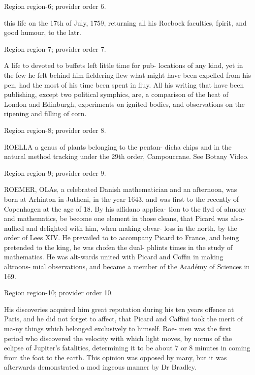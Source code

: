 \documentclass[11pt]{article}
\begin{document}
{\scriptsize\color{gray} Region region-6; provider order 6.\par}
\medskip

this life on the 17th of July, 1759, returning all his Roebock faculties, fpirit, and good humour, to the latr.
\par

{\scriptsize\color{gray} Region region-7; provider order 7.\par}
\medskip

A life to devoted to buffets left little time for pub- locations of any kind, yet in the few he felt behind him fieldering flew what might have been expelled from his pen, had the most of his time been spent in fluy. All his writing that have been publishing, except two political symphics, are, a comparison of the heat of London and Edinburgh, experiments on ignited bodies, and observations on the ripening and filling of corn.
\par

{\scriptsize\color{gray} Region region-8; provider order 8.\par}
\medskip

ROELLA a genus of plants belonging to the pentan- dicha chips and in the natural method tracking under the 29th order, Campouccane. See Botany Video.
\par

{\scriptsize\color{gray} Region region-9; provider order 9.\par}
\medskip

ROEMER, OLAs, a celebrated Danish mathematician and an afternoon, was born at Arhinton in Jutheni, in the year 1643, and was first to the recently of Copenhagen at the age of 18. By his affidano applica- tion to the flyd of almony and mathematics, be become one element in those cleans, that Picard was also- nulhed and delighted with him, when making obvar- loss in the north, by the order of Lees XIV. He prevailed to to accompany Picard to France, and being pretended to the king, he was chofen the dual- phlints times in the study of mathematics. He was alt-wards united with Picard and Coffin in making altroons- mial observations, and became a member of the Académy of Sciences in 169.
\par

{\scriptsize\color{gray} Region region-10; provider order 10.\par}
\medskip

His discoveries acquired him great reputation during his ten years offence at Paris, and he did not forget to affect, that Picard and Caffini took the merit of ma-ny things which belonged exclusively to himself. Roe- men was the first period who discovered the velocity with which light moves, by norms of the eclipse of Jupiter’s fatalities, determining it to be about 7 or 8 minutes in coming from the foot to the earth. This opinion was opposed by many, but it was afterwards demonstrated a mod ingeous manner by Dr Bradley.
\par
\end{document}

